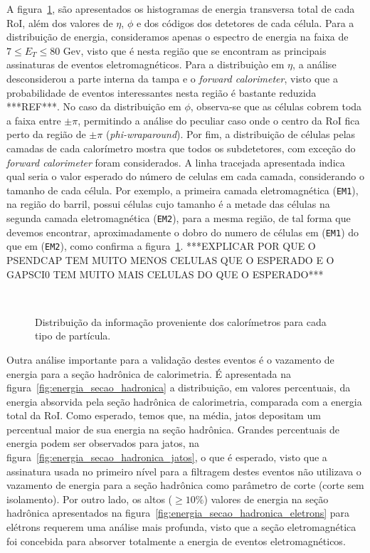 A figura~\ref{fig:estatistica_inicial}, são apresentados os histogramas de energia transversa total de cada RoI, além dos valores de $\eta$, $\phi$ e dos códigos dos detetores de cada célula. Para a distribuição de energia, consideramos apenas o espectro de energia na faixa de $7 \le E_T \le 80$ Gev, visto que é nesta região que se encontram as principais assinaturas de eventos eletromagnéticos. Para a distribuiçào em $\eta$, a análise desconsiderou a parte interna da tampa e o \emph{forward calorimeter}, visto que a probabilidade de eventos interessantes nesta região é bastante reduzida ***REF***.  No caso da distribuição em $\phi$, observa-se que  as células cobrem toda a faixa entre $\pm \pi$, permitindo a análise do peculiar caso onde o centro da RoI fica perto da região de $\pm \pi$ (\emph{phi-wraparound}). Por fim, a distribuição de células pelas camadas de cada calorímetro mostra que todos os subdetetores, com exceção do \emph{forward calorimeter} foram considerados. A linha tracejada apresentada indica qual seria o valor esperado do número de celulas em cada camada, considerando o tamanho de cada célula. Por exemplo, a primeira camada eletromagnética (\texttt{EM1}), na região do barril,  possui células cujo tamanho é a metade das células na segunda camada eletromagnética (\texttt{EM2}), para a mesma região, de tal forma que devemos encontrar, aproximadamente o dobro do numero de células em (\texttt{EM1}) do que em (\texttt{EM2}), como confirma a figura~\ref{fig:estatistica_inicial}. ***EXPLICAR POR QUE O PSENDCAP TEM MUITO MENOS CELULAS QUE O ESPERADO E O GAPSCI0 TEM MUITO MAIS CELULAS DO QUE O ESPERADO***

\begin{figure}
\centering 
{} \\
\caption{Distribuição da informação proveniente dos calorímetros para cada tipo de partícula.} 
\label{fig:estatistica_inicial} 
\end{figure} 


Outra análise importante para a validação destes eventos é o vazamento de energia para a seção hadrônica de calorimetria. É apresentada na figura~\ref{fig:energia_secao_hadronica} a distribuição, em valores percentuais, da energia absorvida pela seção hadrônica de calorimetria, comparada com a energia total da RoI. Como esperado, temos que, na média, jatos depositam um percentual maior de sua energia na seção hadrônica. Grandes percentuais de energia podem ser observados para jatos, na figura~\ref{fig:energia_secao_hadronica_jatos}, o que é esperado, visto que a assinatura usada no  primeiro nível para a filtragem destes eventos não utilizava o vazamento de energia para a seção hadrônica como parâmetro de corte (corte sem isolamento). Por outro lado,  os altos ($\ge 10\%$) valores de energia na seção hadrônica apresentados na figura~\ref{fig:energia_secao_hadronica_eletrons} para elétrons requerem uma análise mais profunda, visto que a seção eletromagnética foi concebida para absorver totalmente a energia de eventos eletromagnéticos. 

